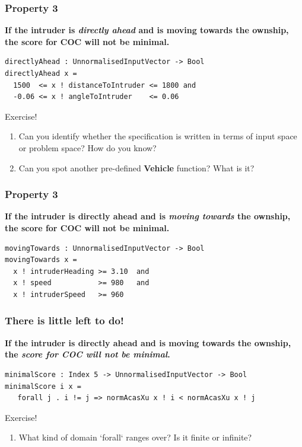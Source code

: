 \documentclass[t,compress,aspectratio=169]{beamer}
\begin{document}
\begin{frame}[fragile]
\frametitle{Property 3}


\footnotesize{\textbf{If the intruder is \emph{directly ahead} and is moving towards the
 ownship, the score for COC will not be minimal.}}

\pause

\begin{verbatim}
directlyAhead : UnnormalisedInputVector -> Bool
directlyAhead x =
  1500  <= x ! distanceToIntruder <= 1800 and
  -0.06 <= x ! angleToIntruder    <= 0.06
\end{verbatim}
\pause
\begin{block}{Exercise!}
\footnotesize{
\begin{enumerate}
\item
Can you identify whether the specification is written in terms of input space or problem space? How do you know?
\item Can you spot another pre-defined \textbf{Vehicle} function? What is it?
\end{enumerate}}
\end{block}

\end{frame}




\begin{frame}[fragile]
\frametitle{Property 3}

\footnotesize{\textbf{If the intruder is directly ahead and is \emph{moving towards} the
 ownship, the score for COC will not be minimal.}}

\pause

\begin{verbatim}
movingTowards : UnnormalisedInputVector -> Bool
movingTowards x =
  x ! intruderHeading >= 3.10  and
  x ! speed           >= 980   and
  x ! intruderSpeed   >= 960
\end{verbatim}


\end{frame}

\begin{frame}[fragile]
\frametitle{There is little left to do!}

\footnotesize{
\textbf{If the intruder is directly ahead and is moving towards the
 ownship, the \emph{score for COC will not be minimal}.}}

\pause

\begin{verbatim}
minimalScore : Index 5 -> UnnormalisedInputVector -> Bool
minimalScore i x =
   forall j . i != j => normAcasXu x ! i < normAcasXu x ! j
\end{verbatim}
\pause
\begin{block}{Exercise!}
\footnotesize{
\begin{enumerate}
\item What kind of domain  `forall` ranges over? Is it finite or infinite?
\end{enumerate}}
\end{block}

\end{frame}
\end{document}
